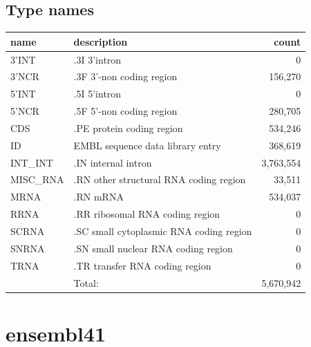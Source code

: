 \documentclass{article}
\begin{document}
\begin{Schunk}
\subsection{Type names}
\noindent\begin{tabular}{llr}
\hline \hline
name & description & count \\
\hline
3'INT  &  .3I 3'intron  &  0 \\
3'NCR  &  .3F  3'-non coding region  &  156,270 \\
5'INT  &  .5I 5'intron  &  0 \\
5'NCR  &  .5F  5'-non coding region  &  280,705 \\
CDS  &  .PE protein coding region  &  534,246 \\
ID  &  EMBL sequence data library entry  &  368,619 \\
INT\_INT  &  .IN  internal intron  &  3,763,554 \\
MISC\_RNA  &  .RN other structural RNA coding region  &  33,511 \\
MRNA  &  .RN mRNA  &  534,037 \\
RRNA  &  .RR ribosomal RNA coding region  &  0 \\
SCRNA  &  .SC small cytoplasmic RNA coding region  &  0 \\
SNRNA  &  .SN small nuclear RNA coding region  &  0 \\
TRNA  &  .TR transfer RNA coding region  &  0 \\
\hline
 & Total: & 5,670,942 \\
\hline \hline
\end{tabular}

\section{ ensembl41 }

\end{Schunk}
\end{document}
